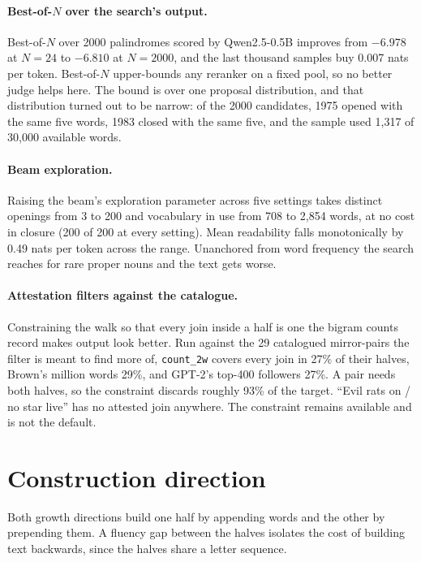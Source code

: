 \documentclass[11pt]{article}
\begin{document}
\paragraph{Best-of-$N$ over the search's output.}
Best-of-$N$ over 2000 palindromes scored by Qwen2.5-0.5B \citep{qwen2024}
improves from $-6.978$ at $N{=}24$ to $-6.810$ at $N{=}2000$, and the last
thousand samples buy 0.007 nats per token. Best-of-$N$ upper-bounds any
reranker on a fixed pool, so no better judge helps here. The bound is over one
proposal distribution, and that distribution turned out to be narrow: of the
2000 candidates, 1975 opened with the same five words, 1983 closed with the
same five, and the sample used 1{,}317 of 30{,}000 available words.

\paragraph{Beam exploration.}
Raising the beam's exploration parameter across five settings takes distinct
openings from 3 to 200 and vocabulary in use from 708 to 2{,}854 words, at no
cost in closure (200 of 200 at every setting). Mean readability falls
monotonically by 0.49 nats per token across the range. Unanchored from word
frequency the search reaches for rare proper nouns and the text gets worse.

\paragraph{Attestation filters against the catalogue.}
Constraining the walk so that every join inside a half is one the bigram counts
record makes output look better. Run against the 29 catalogued mirror-pairs the
filter is meant to find more of, \texttt{count\_2w} covers every join in 27\% of
their halves, Brown's million words 29\%, and GPT-2's top-400 followers 27\%. A
pair needs both halves, so the constraint discards roughly 93\% of the target.
``Evil rats on / no star live'' has no attested join anywhere. The constraint
remains available and is not the default.

\section{Construction direction}
\label{sec:direction}

Both growth directions build one half by appending words and the other by
prepending them. A fluency gap between the halves isolates the cost of building
text backwards, since the halves share a letter sequence.
\end{document}
